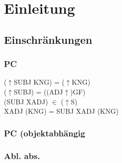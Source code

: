 \documentclass[12pt,a4paper]{article}
\begin{document}

\setcounter{page}{2}
\begingroup
\flushbottom
\tableofcontents
\thispagestyle{empty}
\pagebreak
\endgroup
\section{Einleitung}
\nocite{lucil1}
\nocite{lucil2} 
\nocite{original}
\nocite{seneca66} 
\nocite{hachmann1995} 
\nocite{bartsch}  
\nocite{philatinFLU} 
\nocite{becker1893sittlichen} 
\nocite{cancik} 
\nocite{inwood}
\nocite{edwards}
\nocite{motto} 
\nocite{becker1893sittlichen}
\nocite{philatinAUDIS}


\subsection{Einschränkungen}

\subsubsection{PC}

($\uparrow$SUBJ KNG) = ($\uparrow$KNG)\\
($\uparrow$SUBJ) = ((ADJ$\uparrow$)GF) \\
(SUBJ XADJ) $\in$ ($\uparrow$S)\\

XADJ (KNG) = SUBJ XADJ (KNG) \\

\subsubsection{PC (objektabhängig}

\subsubsection{Abl. abs.}
\end{document}
